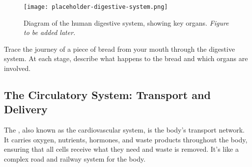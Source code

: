\begin{figure}[htb]
    \centering
    \texttt{[image: placeholder-digestive-system.png]}
    \caption{Diagram of the human digestive system, showing key organs. \textit{Figure to be added later.}}
    \label{fig:digestive-system}
\end{figure}

\begin{stopandthink}
Trace the journey of a piece of bread from your mouth through the digestive system.  At each stage, describe what happens to the bread and which organs are involved.
\end{stopandthink}


\subsection{The Circulatory System: Transport and Delivery}

The , also known as the cardiovascular system, is the body's transport network.  It carries oxygen, nutrients, hormones, and waste products throughout the body, ensuring that all cells receive what they need and waste is removed.  It's like a complex road and railway system for the body.

